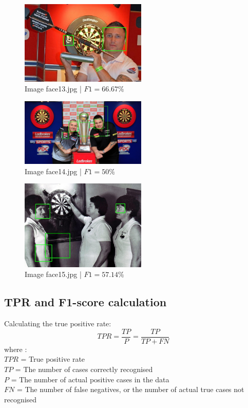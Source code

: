 \documentclass[conference]{IEEEtran}
\begin{document}
\begin{figure}[ht!]
\centering
\includegraphics[width=60mm]{img/Viola_Jones_Faces/face_detection13.jpg}
\caption{Image face13.jpg | $F1 = 66.67\%$ \label{img_face_13}}
\end{figure}

\begin{figure}[ht!]
\centering
\includegraphics[width=60mm]{img/Viola_Jones_Faces/face_detection14.jpg}
\caption{Image face14.jpg | $F1 = 50\%$ \label{img_face_14}}
\end{figure}

\begin{figure}[ht!]
\centering
\includegraphics[width=60mm]{img/Viola_Jones_Faces/face_detection15.jpg}
\caption{Image face15.jpg | $F1 = 57.14\%$ \label{img_face_15}}
\end{figure}

\subsection{TPR and F1-score calculation}

Calculating the true positive rate:
\[TPR = \frac{TP}{P} = \frac{TP}{TP+FN}\]
where :\\
$TPR$ = True positive rate \\
$TP$ = The number of cases correctly recognised \\
$P$ = The number of actual positive cases in the data\\
$FN$ = The number of false negatives, or the number of actual true cases not recognised\\
\end{document}
